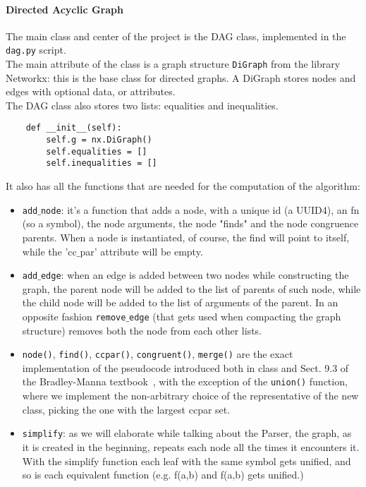 \documentclass[11pt]{article}
\begin{document}
\paragraph{Directed Acyclic Graph}
    The main class and center of the project is the DAG class, implemented in the \texttt{dag.py} script.\\
    The main attribute of the class is a graph structure \texttt{DiGraph} from the library Networkx: this is the base class for directed graphs. A DiGraph stores nodes and edges with optional data, or attributes.\\
    The DAG class also stores two lists: equalities and inequalities.
    \begin{lstlisting}
    def __init__(self): 
        self.g = nx.DiGraph()
        self.equalities = []
        self.inequalities = []
    \end{lstlisting}
    It also has all the functions that are needed for the computation of the algorithm:
        \begin{itemize}
            \item \texttt{add$\_$node}: it's a function that adds a node, with a unique id (a UUID4), an fn (so a symbol), the node arguments, the node "finds" and the node congruence parents. When a node is instantiated, of course, the find will point to itself, while the 'cc$\_$par' attribute will be empty.
            \item \texttt{add$\_$edge}: when an edge is added between two nodes while constructing the graph, the parent node will be added to the list of parents of such node, while the child node will be added to the list of arguments of the parent. In an opposite fashion \texttt{remove$\_$edge} (that gets used when compacting the graph structure) removes both the node from each other lists.
            \item \texttt{node()}, \texttt{find()}, \texttt{ccpar()}, \texttt{congruent()}, \texttt{merge()} are the exact implementation of the pseudocode introduced both in class and Sect. 9.3 of the Bradley-Manna textbook~\cite{manna}, with the exception of the \texttt{union()} function, where we implement the non-arbitrary choice of the representative of the new class, picking the one with the largest ccpar set.
            
            \item \texttt{simplify}: as we will elaborate while talking about the Parser, the graph, as it is created in the beginning, repeats each node all the times it encounters it. With the simplify function each leaf with the same symbol gets unified, and so is each equivalent function (e.g. f(a,b) and f(a,b) gets unified.) 
        \end{itemize}
\end{document}
